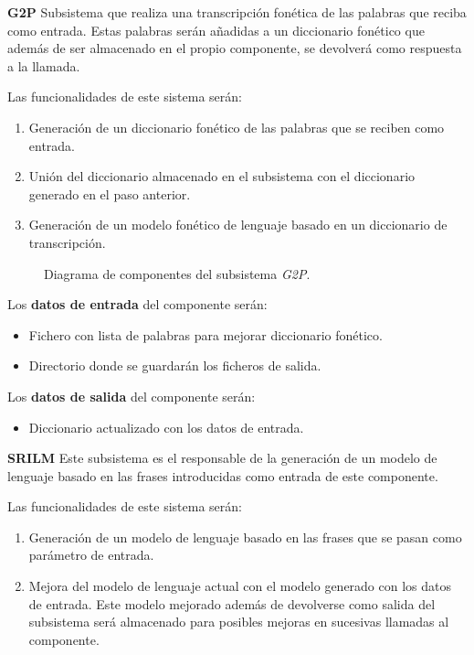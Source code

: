 \documentclass[../main.tex]{subfiles}
\begin{document}
\textbf{G2P}\label{par:g2p}
Subsistema que realiza una transcripción fonética de las palabras que reciba como entrada. Estas palabras serán añadidas a un diccionario fonético que además de ser almacenado en el propio componente, se devolverá como respuesta a la llamada.

Las funcionalidades de este sistema serán:
\begin{enumerate}
    \item Generación de un diccionario fonético de las palabras que se reciben como entrada.
    \item Unión del diccionario almacenado en el subsistema con el diccionario generado en el paso anterior.
    \item Generación de un modelo fonético de lenguaje basado en un diccionario de transcripción.
\end{enumerate}

\begin{figure}[H]
    \centering
    
    \label{fig:components_g2p}
    \caption{Diagrama de componentes del subsistema \textit{G2P}.}
\end{figure}

Los \textbf{datos de entrada} del componente serán:
\begin{itemize}
    \item Fichero con lista de palabras para mejorar diccionario fonético.
    \item Directorio donde se guardarán los ficheros de salida.
\end{itemize}

Los \textbf{datos de salida} del componente serán:
\begin{itemize}
    \item Diccionario actualizado con los datos de entrada.
\end{itemize}

\textbf{SRILM}\label{par:srilm}
Este subsistema es el responsable de la generación de un modelo de lenguaje basado en las frases introducidas como entrada de este componente.

Las funcionalidades de este sistema serán:
\begin{enumerate}
    \item Generación de un modelo de lenguaje basado en las frases que se pasan como parámetro de entrada.
    \item Mejora del modelo de lenguaje actual con el modelo generado con los datos de entrada. Este modelo mejorado además de devolverse como salida del subsistema será almacenado para posibles mejoras en sucesivas llamadas al componente.
\end{enumerate}
\end{document}
